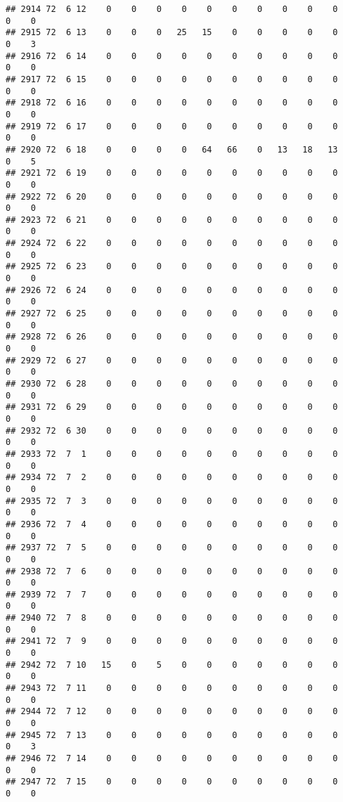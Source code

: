 \documentclass[]{article}
\begin{document}
\begin{verbatim}
## 2914 72  6 12    0    0    0    0    0    0    0    0    0    0    0    0
## 2915 72  6 13    0    0    0   25   15    0    0    0    0    0    0    3
## 2916 72  6 14    0    0    0    0    0    0    0    0    0    0    0    0
## 2917 72  6 15    0    0    0    0    0    0    0    0    0    0    0    0
## 2918 72  6 16    0    0    0    0    0    0    0    0    0    0    0    0
## 2919 72  6 17    0    0    0    0    0    0    0    0    0    0    0    0
## 2920 72  6 18    0    0    0    0   64   66    0   13   18   13    0    5
## 2921 72  6 19    0    0    0    0    0    0    0    0    0    0    0    0
## 2922 72  6 20    0    0    0    0    0    0    0    0    0    0    0    0
## 2923 72  6 21    0    0    0    0    0    0    0    0    0    0    0    0
## 2924 72  6 22    0    0    0    0    0    0    0    0    0    0    0    0
## 2925 72  6 23    0    0    0    0    0    0    0    0    0    0    0    0
## 2926 72  6 24    0    0    0    0    0    0    0    0    0    0    0    0
## 2927 72  6 25    0    0    0    0    0    0    0    0    0    0    0    0
## 2928 72  6 26    0    0    0    0    0    0    0    0    0    0    0    0
## 2929 72  6 27    0    0    0    0    0    0    0    0    0    0    0    0
## 2930 72  6 28    0    0    0    0    0    0    0    0    0    0    0    0
## 2931 72  6 29    0    0    0    0    0    0    0    0    0    0    0    0
## 2932 72  6 30    0    0    0    0    0    0    0    0    0    0    0    0
## 2933 72  7  1    0    0    0    0    0    0    0    0    0    0    0    0
## 2934 72  7  2    0    0    0    0    0    0    0    0    0    0    0    0
## 2935 72  7  3    0    0    0    0    0    0    0    0    0    0    0    0
## 2936 72  7  4    0    0    0    0    0    0    0    0    0    0    0    0
## 2937 72  7  5    0    0    0    0    0    0    0    0    0    0    0    0
## 2938 72  7  6    0    0    0    0    0    0    0    0    0    0    0    0
## 2939 72  7  7    0    0    0    0    0    0    0    0    0    0    0    0
## 2940 72  7  8    0    0    0    0    0    0    0    0    0    0    0    0
## 2941 72  7  9    0    0    0    0    0    0    0    0    0    0    0    0
## 2942 72  7 10   15    0    5    0    0    0    0    0    0    0    0    0
## 2943 72  7 11    0    0    0    0    0    0    0    0    0    0    0    0
## 2944 72  7 12    0    0    0    0    0    0    0    0    0    0    0    0
## 2945 72  7 13    0    0    0    0    0    0    0    0    0    0    0    3
## 2946 72  7 14    0    0    0    0    0    0    0    0    0    0    0    0
## 2947 72  7 15    0    0    0    0    0    0    0    0    0    0    0    0

\end{verbatim}
\end{document}
